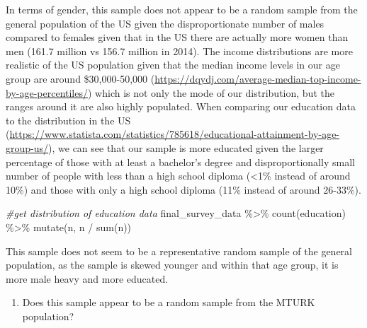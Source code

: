 \documentclass[
]{article}
\newenvironment{Shaded}{\begin{snugshade}}{\end{snugshade}}
\newcommand{\CommentTok}[1]{\textcolor[rgb]{0.56,0.35,0.01}{\textit{#1}}}
\newcommand{\FunctionTok}[1]{\textcolor[rgb]{0.00,0.00,0.00}{#1}}
\newcommand{\NormalTok}[1]{#1}
\newcommand{\SpecialCharTok}[1]{\textcolor[rgb]{0.00,0.00,0.00}{#1}}
\providecommand{\tightlist}{%
  \setlength{\itemsep}{0pt}\setlength{\parskip}{0pt}}
\begin{document}
In terms of gender, this sample does not appear to be a random sample
from the general population of the US given the disproportionate number
of males compared to females given that in the US there are actually
more women than men (161.7 million vs 156.7 million in 2014). The income
distributions are more realistic of the US population given that the
median income levels in our age group are around \$30,000-50,000
(\url{https://dqydj.com/average-median-top-income-by-age-percentiles/})
which is not only the mode of our distribution, but the ranges around it
are also highly populated. When comparing our education data to the
distribution in the US
(\url{https://www.statista.com/statistics/785618/educational-attainment-by-age-group-us/}),
we can see that our sample is more educated given the larger percentage
of those with at least a bachelor's degree and disproportionally small
number of people with less than a high school diploma (\textless1\%
instead of around 10\%) and those with only a high school diploma (11\%
instead of around 26-33\%).

\begin{Shaded}
\begin{Highlighting}[]
\CommentTok{\#get distribution of education data}
\NormalTok{final\_survey\_data }\SpecialCharTok{\%\textgreater{}\%} \FunctionTok{count}\NormalTok{(education) }\SpecialCharTok{\%\textgreater{}\%} \FunctionTok{mutate}\NormalTok{(n, n }\SpecialCharTok{/} \FunctionTok{sum}\NormalTok{(n))}
\end{Highlighting}
\end{Shaded}

This sample does not seem to be a representative random sample of the
general population, as the sample is skewed younger and within that age
group, it is more male heavy and more educated.

\begin{enumerate}
\def\labelenumi{\roman{enumi}.}
\setcounter{enumi}{1}
\tightlist
\item
  Does this sample appear to be a random sample from the MTURK
  population?
\end{enumerate}
\end{document}
